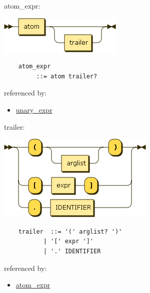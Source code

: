 \begin{minipage}{\textwidth}
    \protect\hypertarget{atom_expr}{}{atom\_expr:}

    \includegraphics[width=2.33333in,height=0.70833in]{diagram/atom_expr.png}

    \begin{verbatim}
    atom_expr
         ::= atom trailer?
    \end{verbatim}

    referenced by:

    \begin{itemize}
            \tightlist
        \item
            \protect\hyperlink{unary_expr}{unary\_expr}
    \end{itemize}

\end{minipage}

\begin{minipage}{\textwidth}
    \protect\hypertarget{trailer}{}{trailer:}

    \includegraphics[width=2.95833in,height=1.62500in]{diagram/trailer.png}

    \begin{verbatim}
    trailer  ::= '(' arglist? ')'
           | '[' expr ']'
           | '.' IDENTIFIER
    \end{verbatim}

    referenced by:

    \begin{itemize}
            \tightlist
        \item
            \protect\hyperlink{atom_expr}{atom\_expr}
    \end{itemize}

\end{minipage}

